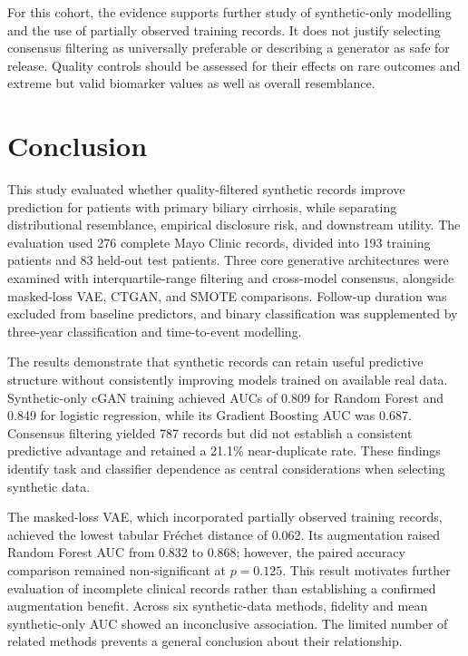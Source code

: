 \documentclass[journal]{IEEEtran}
\begin{document}
For this cohort, the evidence supports further study of synthetic-only modelling and the use of partially observed training records. It does not justify selecting consensus filtering as universally preferable or describing a generator as safe for release. Quality controls should be assessed for their effects on rare outcomes and extreme but valid biomarker values as well as overall resemblance.


\section{Conclusion}
\label{sec:conclusion}

This study evaluated whether quality-filtered synthetic records improve prediction for patients with primary biliary cirrhosis, while separating distributional resemblance, empirical disclosure risk, and downstream utility. The evaluation used 276 complete Mayo Clinic records, divided into 193 training patients and 83 held-out test patients. Three core generative architectures were examined with interquartile-range filtering and cross-model consensus, alongside masked-loss VAE, CTGAN, and SMOTE comparisons. Follow-up duration was excluded from baseline predictors, and binary classification was supplemented by three-year classification and time-to-event modelling.

The results demonstrate that synthetic records can retain useful predictive structure without consistently improving models trained on available real data. Synthetic-only cGAN training achieved AUCs of 0.809 for Random Forest and 0.849 for logistic regression, while its Gradient Boosting AUC was 0.687. Consensus filtering yielded 787 records but did not establish a consistent predictive advantage and retained a 21.1\% near-duplicate rate. These findings identify task and classifier dependence as central considerations when selecting synthetic data.

The masked-loss VAE, which incorporated partially observed training records, achieved the lowest tabular Fr\'{e}chet distance of 0.062. Its augmentation raised Random Forest AUC from 0.832 to 0.868; however, the paired accuracy comparison remained non-significant at $p=0.125$. This result motivates further evaluation of incomplete clinical records rather than establishing a confirmed augmentation benefit. Across six synthetic-data methods, fidelity and mean synthetic-only AUC showed an inconclusive association. The limited number of related methods prevents a general conclusion about their relationship.
\end{document}
